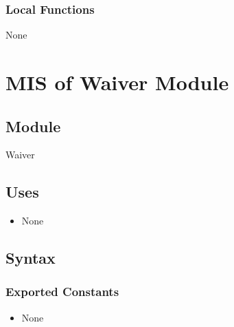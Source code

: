 \documentclass[12pt, titlepage]{article}
\begin{document}
\subsubsection{Local Functions}
None

\section{MIS of Waiver Module} \label{WaiverModule}

\subsection{Module}
Waiver

\subsection{Uses}

\begin{itemize}
    \item None
\end{itemize}

\subsection{Syntax}

\subsubsection{Exported Constants}
\begin{itemize}
    \item None
\end{itemize}
\end{document}
